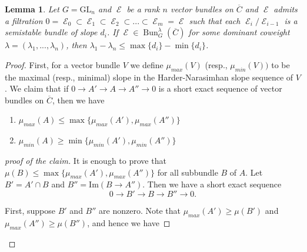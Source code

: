 \documentclass[11pt]{amsart}
\newtheorem{lem}[thm]{Lemma}
\theoremstyle{definition}
\theoremstyle{remark}
\DeclareMathOperator{\E}{\mathcal{E}}
\DeclareMathOperator{\bun}{Bun}
\newcommand{\GL}{\mathrm{GL}}
\numberwithin{equation}{section}
\begin{document}
\begin{lem}\label{ext gap implies HN gap}
    Let $G=\GL_n$ and $\E$ be a rank $n$ vector bundles on $\overline{C}$ and $\E$ admits a filtration $0=\E_0 \subset \E_1 \subset \E_2 \subset ... \subset \E_m=\E$ such that each $\E_{i}/\E_{i-1}$ is a semistable bundle of slope $d_i$. If $\E \in \bun_G^\lambda(\overline{C})$ for some dominant coweight $\lambda = (\lambda_1,...,\lambda_n)$, then $\lambda_1-\lambda_n \leq \max \lbrace d_i \rbrace - \min \lbrace d_i \rbrace $.
\end{lem}
\begin{proof}
    First, for a vector bundle $V$ we define $\mu_{max}(V)$ (resp., $\mu_{min}(V))$ to be the maximal (resp., minimal) slope in the Harder-Narasimhan slope sequence of $V$. We claim that if $0 \to A' \to A \to A'' \to 0$ is a short exact sequence of vector bundles on $\overline{C}$, then we have \begin{enumerate}
        \item $\mu_{max}(A) \leq \max \lbrace \mu_{max}(A'), \mu_{max}(A'')\rbrace$
        \item $\mu_{min}(A) \geq \min \lbrace \mu_{min}(A'), \mu_{min}(A'')\rbrace$
    \end{enumerate}
    
    \begin{proof}[proof of the claim]
        It is enough to prove that $\mu(B) \leq \max \lbrace \mu_{max}(A'), \mu_{max}(A'')\rbrace $ for all subbundle $B$ of $A$. Let $B'=A'\cap B $ and $B''=\text{Im}(B \to A'')$. Then we have a short exact sequence
        $$ 0 \to B' \to B \to B'' \to 0.$$
        
        First, suppose $ B'$ and $B''$ are nonzero. Note that $\mu_{max}(A') \geq \mu(B')$ and $\mu_{max}(A'') \geq \mu(B'')$, and hence we have


\end{proof}
\end{proof}
\end{document}
